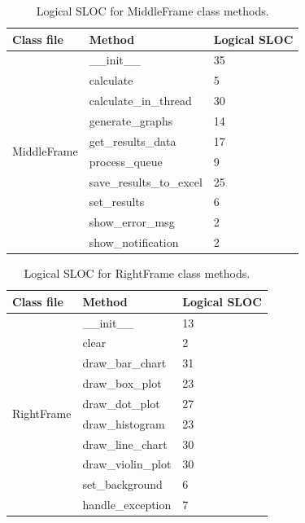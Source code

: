 \documentclass[english,12pt,a4paper]{report}
\begin{document}
	\begin{table}[htbp]
		\centering
		\begin{tabular}{|m{4cm}|m{4cm}|m{2cm}|}
			\hline
			\textbf{Class file} & \textbf{Method} & \textbf{Logical SLOC} \\
			\hline
			\multirow{10}{*}{MiddleFrame} & \_\_init\_\_ & 35 \\
			\cline{2-3}
			& calculate & 5 \\
			\cline{2-3}
			& calculate\_in\_thread & 30 \\
			\cline{2-3}
			& generate\_graphs & 14 \\
			\cline{2-3}
			& get\_results\_data & 17 \\
			\cline{2-3}
			& process\_queue & 9 \\
			\cline{2-3}
			& save\_results\_to\_excel & 25 \\
			\cline{2-3}
			& set\_results & 6 \\
			\cline{2-3}
			& show\_error\_msg & 2 \\
			\cline{2-3}
			& show\_notification & 2 \\
			\hline
		\end{tabular}
		\caption{Logical SLOC for MiddleFrame class methods.}
	\end{table}
	
	\begin{table}[htbp]
		\centering
		\begin{tabular}{|m{4cm}|m{4cm}|m{2cm}|}
			\hline
			\textbf{Class file} & \textbf{Method} & \textbf{Logical SLOC} \\
			\hline
			\multirow{10}{*}{RightFrame} & \_\_init\_\_ & 13 \\
			\cline{2-3}
			& clear & 2 \\
			\cline{2-3}
			& draw\_bar\_chart & 31 \\
			\cline{2-3}
			& draw\_box\_plot & 23 \\
			\cline{2-3}
			& draw\_dot\_plot & 27 \\
			\cline{2-3}
			& draw\_histogram & 23 \\
			\cline{2-3}
			& draw\_line\_chart & 30 \\
			\cline{2-3}
			& draw\_violin\_plot & 30 \\
			\cline{2-3}
			& set\_background & 6 \\
			\cline{2-3}
			& handle\_exception & 7 \\
			\hline
		\end{tabular}
		\caption{Logical SLOC for RightFrame class methods.}
	\end{table}
	
\end{document}
